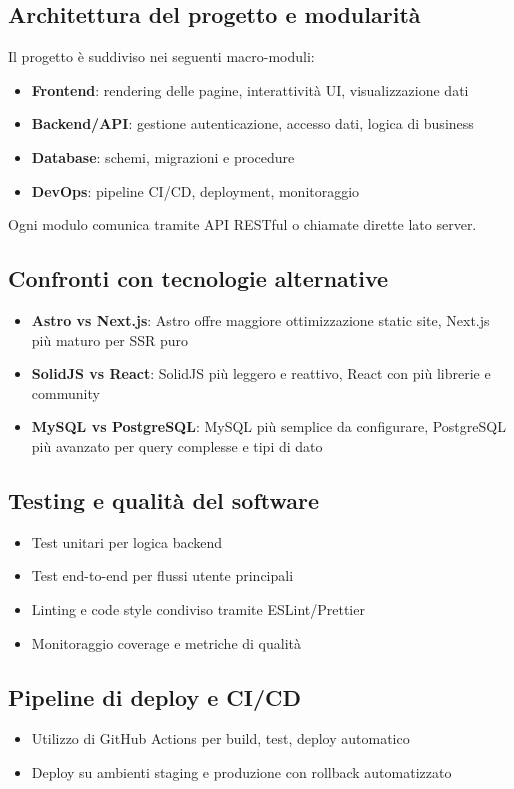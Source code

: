 \subsection{Architettura del progetto e modularità}
Il progetto è suddiviso nei seguenti macro-moduli:
\begin{itemize}
    \item \textbf{Frontend}: rendering delle pagine, interattività UI, visualizzazione dati
    \item \textbf{Backend/API}: gestione autenticazione, accesso dati, logica di business
    \item \textbf{Database}: schemi, migrazioni e procedure
    \item \textbf{DevOps}: pipeline CI/CD, deployment, monitoraggio
\end{itemize}
Ogni modulo comunica tramite API RESTful o chiamate dirette lato server.

\subsection{Confronti con tecnologie alternative}
\begin{itemize}
    \item \textbf{Astro vs Next.js}: Astro offre maggiore ottimizzazione static site, Next.js più maturo per SSR puro
    \item \textbf{SolidJS vs React}: SolidJS più leggero e reattivo, React con più librerie e community
    \item \textbf{MySQL vs PostgreSQL}: MySQL più semplice da configurare, PostgreSQL più avanzato per query complesse e tipi di dato
\end{itemize}

\subsection{Testing e qualità del software}
\begin{itemize}
    \item Test unitari per logica backend
    \item Test end-to-end per flussi utente principali
    \item Linting e code style condiviso tramite ESLint/Prettier
    \item Monitoraggio coverage e metriche di qualità
\end{itemize}

\subsection{Pipeline di deploy e CI/CD}
\begin{itemize}
    \item Utilizzo di GitHub Actions per build, test, deploy automatico
    \item Deploy su ambienti staging e produzione con rollback automatizzato
\end{itemize}

